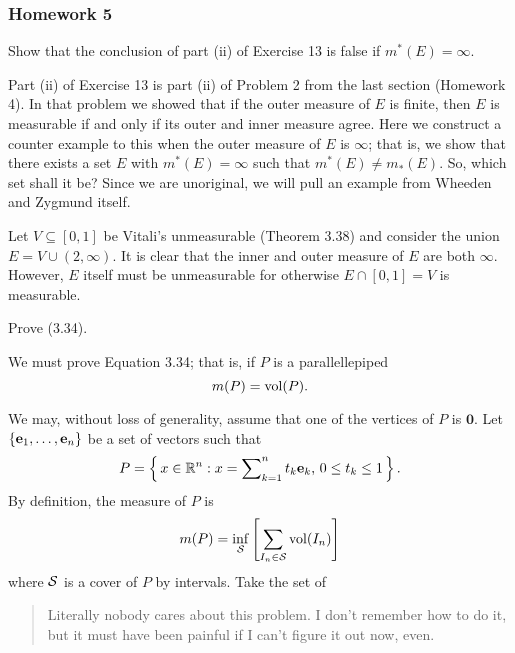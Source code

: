 \subsubsection{Homework 5}
\setcounter{exercise}{0}
\setcounter{equation}{0}

\begin{problem}
  Show that the conclusion of part (ii) of Exercise 13 is false if
  \(m^*(E)=\infty\).
\end{problem}
\begin{solution}
  Part (ii) of Exercise 13 is part (ii) of Problem 2 from the last section
  (Homework 4). In that problem we showed that if the outer measure of
  \(E\) is finite, then \(E\) is measurable if and only if its outer and
  inner measure agree. Here we construct a counter example to this when the
  outer measure of \(E\) is \(\infty\); that is, we show that there exists
  a set \(E\) with \(m^*(E)=\infty\) such that \(m^*(E)\neq m_*(E)\). So,
  which set shall it be? Since we are unoriginal, we will pull an example
  from Wheeden and Zygmund itself.

  Let \(V\subseteq[0,1]\) be Vitali's unmeasurable (Theorem 3.38) and
  consider the union \(E=V\cup(2,\infty)\). It is clear that the inner and
  outer measure of \(E\) are both \(\infty\). However, \(E\) itself must be
  unmeasurable for otherwise \(E\cap [0,1]=V\) is measurable.
\end{solution}

\begin{problem}
  Prove (3.34).
\end{problem}
\begin{solution}
  We must prove Equation 3.34; that is, if \(P\) is a parallellepiped
  \[
    m(P)=\operatorname{vol}(P).
  \]

  We may, without loss of generality, assume that one of the vertices of
  \(P\) is \(\mathbf{0}\). Let \(\{\mathbf{e}_1,\dotsc,\mathbf{e}_n\}\) be a set of
  vectors such that
  \[
    P=\left\{\,x\in\mathbb{R}^n: \text{\(x=\sum\nolimits_{k=1}^n t_k\mathbf{e}_k\),
        \(0\leq t_k\leq 1\)}\,\right\}.
  \]
  By definition, the measure of \(P\) is
  \[
    m(P)=\inf_{\mathcal{S}}\left[\sum_{I_n\in\mathcal{S}}\operatorname{vol}(I_n)\right]
  \]
  where \(\mathcal{S}\) is a cover of \(P\) by intervals. Take the set of
  \begin{quote}
    \begin{remarks*}
      Literally nobody cares about this problem. I don't remember how to do
      it, but it must have been painful if I can't figure it out now, even.
    \end{remarks*}
  \end{quote}
\end{solution}


